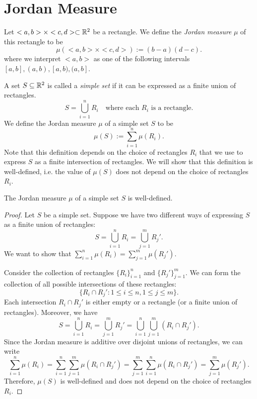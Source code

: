 \section{Jordan Measure}

\begin{definition}
    Let $<a,b>\times<c,d> \subset \mathbb{R}^2$ be a rectangle. We define the \textit{Jordan measure} $\mu$ of this rectangle to be
    \[
        \mu(<a,b>\times<c,d>) := (b-a)(d-c).
    \]
    where we interpret $<a,b>$ as one of the following intervals $[a,b], (a,b), [a,b), (a,b]$.
\end{definition}

\begin{definition}
    A set $S\subseteq \mathbb{R}^2$ is called a \textit{simple set} if it can be expressed as a finite union of rectangles.
    \[
        S = \bigcup_{i=1}^n R_i \quad \text{where each } R_i \text{ is a rectangle.}
    \] 
    We define the Jordan measure $\mu$ of a simple set $S$ to be
    \[
        \mu(S) := \sum_{i=1}^n \mu(R_i).
    \]
    Note that this definition depends on the choice of rectangles $R_i$ that we use to express $S$ as a finite intersection of rectangles. We will show that this definition is well-defined, i.e. the value of $\mu(S)$ does not depend on the choice of rectangles $R_i$.
\end{definition}

\begin{proposition}
    The Jordan measure $\mu$ of a simple set $S$ is well-defined.
\end{proposition}
\begin{proof}
    Let $S$ be a simple set. Suppose we have two different ways of expressing $S$ as a finite union of rectangles:
    \[
        S = \bigcup_{i=1}^n R_i = \bigcup_{j=1}^m R_j'.
    \]
    We want to show that $\sum_{i=1}^n \mu(R_i) = \sum_{j=1}^m \mu(R_j')$.

    Consider the collection of rectangles $\{R_i\}_{i=1}^n$ and $\{R_j'\}_{j=1}^m$. We can form the collection of all possible intersections of these rectangles:
    \[
        \{R_i \cap R_j' : 1 \leq i \leq n, 1 \leq j \leq m\}.
    \]
    Each intersection $R_i \cap R_j'$ is either empty or a rectangle (or a finite union of rectangles). Moreover, we have
    \[
        S = \bigcup_{i=1}^n R_i = \bigcup_{j=1}^m R_j' = \bigcup_{i=1}^n \bigcup_{j=1}^m (R_i \cap R_j').
    \]
    Since the Jordan measure is additive over disjoint unions of rectangles, we can write
    \[
        \sum_{i=1}^n \mu(R_i) = \sum_{i=1}^n \sum_{j=1}^m \mu(R_i \cap R_j') = \sum_{j=1}^m \sum_{i=1}^n \mu(R_i \cap R_j') = \sum_{j=1}^m \mu(R_j').
    \]
    Therefore, $\mu(S)$ is well-defined and does not depend on the choice of rectangles $R_i$.
\end{proof}

